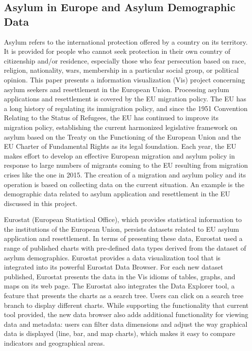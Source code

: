 \documentclass[journal]{vgtc}                %
\begin{document}
\subsection{Asylum in Europe and Asylum Demographic Data}
Asylum refers to the international protection offered by a country on its territory. It is provided for people who cannot seek protection in their own country of citizenship and/or residence, especially those who fear persecution based on race, religion, nationality, wars, membership in a particular social group, or political opinion\cite{unhcr:2012}. This paper presents a information visualization (Vis) project concerning asylum seekers and resettlement in the European Union. Processing asylum applications and resettlement is covered by the EU migration policy. The EU has a long history of regulating its immigration policy, and since the 1951 Convention Relating to the Status of Refugees\cite{the_european_commission:2022}, the EU has continued to improve its migration policy, establishing the current harmonized legislative framework on asylum based on the Treaty on the Functioning of the European Union and the EU Charter of Fundamental Rights as its legal foundation. Each year, the EU makes effort to develop an effective European migration and asylum policy in response to large numbers of migrants coming to the EU resulting from migration crises like the one in 2015\cite{consilium:2022}. The creation of a migration and asylum policy and its operation is based on collecting data on the current situation. An example is the demographic data related to asylum application and resettlement in the EU discussed in this project. 

Eurostat (European Statistical Office), which provides statistical information to the institutions of the European Union, persists datasets related to EU asylum application and resettlement. In terms of presenting these data, Eurostat used a range of published charts with pre-defined data types derived from the dataset of asylum demographics. Eurostat provides a data visualization tool that is integrated into its powerful Eurostat Data Browser\cite{data_browser_eurostat:2020}. For each new dataset published, Eurostat presents the data in the Vis idioms of tables, graphs, and maps on its web page. The Eurostat also integrates the Data Explorer tool, a feature that presents the charts as a search tree. Users can click on a search tree branch to display different charts. While supporting the functionality that current tool provided, the new data browser also adds additional functionality for viewing data and metadata: users can filter data dimensions and adjust the way graphical data is displayed (line, bar, and map charts), which makes it easy to compare indicators and geographical areas\cite{wiki_eurostat:2022}. 
\end{document}
